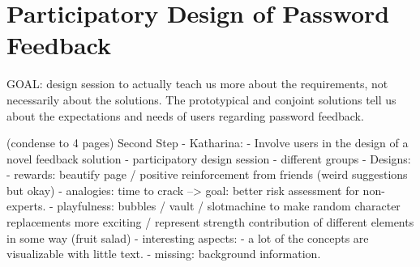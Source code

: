 %
		
\section{Participatory Design of Password Feedback}
GOAL: design session to actually teach us more about the requirements, not necessarily about the solutions. The prototypical and conjoint solutions tell us about the expectations and needs of users regarding password feedback. 

(condense to 4 pages)
Second Step - Katharina: 
- Involve users in the design of a novel feedback solution
	- participatory design session
	- different groups
- Designs:
	- rewards: beautify page / positive reinforcement from friends (weird suggestions but okay)
	- analogies: time to crack --> goal: better risk assessment for non-experts.
	- playfulness: bubbles / vault / slotmachine to make random character replacements more exciting / represent strength contribution of different elements in some way (fruit salad)
- interesting aspects:
	- a lot of the concepts are visualizable with little text.
	- missing: background information.
	
